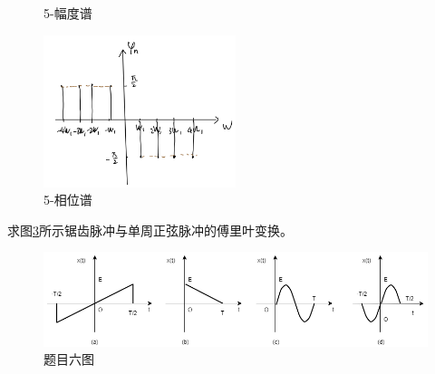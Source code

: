 \documentclass[answers]{exam}  %
\begin{document}
\begin{questions}
\begin{figure}
	\caption{5-幅度谱}
	\label{fig:11}
\end{figure}
\begin{figure}
	\centering
	\includegraphics[width=0.5\textwidth]{pics/5-2.png}
	\caption{5-相位谱}
	\label{fig:12}
\end{figure}
\question 求图\ref{fig:6}所示锯齿脉冲与单周正弦脉冲的傅里叶变换。
\begin{figure}
	\centering
	\includegraphics[width=\linewidth]{pics/dsp2-7.png}
	\caption{题目六图}
	\label{fig:6}
\end{figure}


\end{questions}
\end{document}
